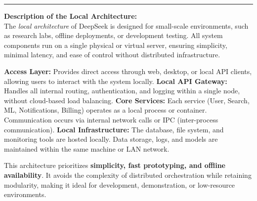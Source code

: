 \documentclass[a4paper,10pt]{article}
\begin{document}
\begin{center}
\end{center}

\vspace{0.6cm}
\noindent\rule{\textwidth}{0.4pt}

\begin{minipage}{\textwidth}
\small
\textbf{Description of the Local Architecture:}\\[0.3em]
The \textit{local architecture} of DeepSeek is designed for small-scale environments, such as research labs, offline deployments, or development testing.  
All system components run on a single physical or virtual server, ensuring simplicity, minimal latency, and ease of control without distributed infrastructure.

\textbf{Access Layer:} Provides direct access through web, desktop, or local API clients, allowing users to interact with the system locally.  
\textbf{Local API Gateway:} Handles all internal routing, authentication, and logging within a single node, without cloud-based load balancing.  
\textbf{Core Services:} Each service (User, Search, ML, Notifications, Billing) operates as a local process or container. Communication occurs via internal network calls or IPC (inter-process communication).  
\textbf{Local Infrastructure:} The database, file system, and monitoring tools are hosted locally. Data storage, logs, and models are maintained within the same machine or LAN network.

This architecture prioritizes \textbf{simplicity, fast prototyping, and offline availability}. It avoids the complexity of distributed orchestration while retaining modularity, making it ideal for development, demonstration, or low-resource environments.
\end{minipage}
\end{document}
